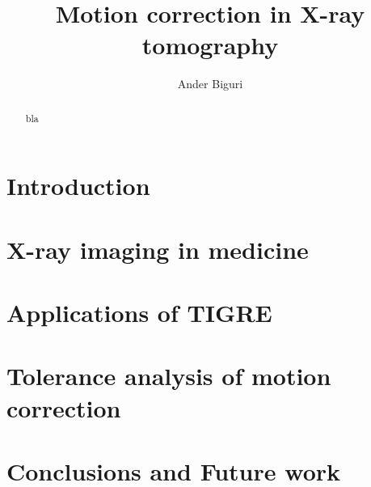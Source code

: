 \documentclass[11pt]{report}
\title{Motion correction in X-ray tomography}
\author{Ander Biguri}
\begin{document}
\maketitle

\begin{abstract}
bla
\end{abstract}


\tableofcontents

\chapter{Introduction}\label{ch:intro}
\chapter{X-ray imaging in medicine}\label{ch:soa}
\label{ch:rec}


\chapter{Applications of TIGRE}\label{ch:apllications}
\chapter{Tolerance analysis of motion correction}\label{ch:motion analisis}
\chapter{Conclusions and Future work}\label{ch:conclusions}



\end{document}
